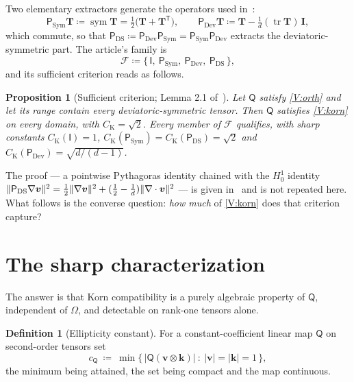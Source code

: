\documentclass[11pt]{article}
\theoremstyle{plain}
\newtheorem{proposition}[theorem]{Proposition}
\theoremstyle{definition}
\newtheorem{definition}[theorem]{Definition}
\theoremstyle{remark}
\newcommand{\IPi}{\mathsf{I}}
\newcommand{\AnyProj}{\mathsf{Q}}
\newcommand{\DSPi}{\mathsf{P}_{\mathrm{DS}}}
\newcommand{\DPi}{\mathsf{P}_{\mathrm{Dev}}}
\newcommand{\SPi}{\mathsf{P}_{\mathrm{Sym}}}
\newcommand{\bv}{\boldsymbol{v}}
\newcommand{\bk}{\boldsymbol{k}}
\newcommand{\CK}{C_{\mathrm{K}}}
\newcommand{\cP}{c_{\AnyProj}}
\DeclarePairedDelimiter{\norm}{\lVert}{\rVert}
\begin{document}
\noindent Two elementary extractors generate the operators used in~\cite{paper}:
\begin{equation}\label{eq:extractors}
  \SPi\mathbf{T}\coloneqq\operatorname{sym}\mathbf{T}
  =\tfrac12\bigl(\mathbf{T}+\mathbf{T}^{\mathsf T}\bigr),
  \qquad
  \DPi\mathbf{T}\coloneqq\mathbf{T}-\tfrac1d(\operatorname{tr}\mathbf{T})\,\mathbf{I},
\end{equation}
which commute, so that $\DSPi\coloneqq\DPi\SPi=\SPi\DPi$ extracts the deviatoric{-}symmetric
part. The article's family is
\begin{equation}\label{eq:family}
  \mathcal{F}\coloneqq\bigl\{\,\IPi,\ \SPi,\ \DPi,\ \DSPi\,\bigr\},
\end{equation}
and its sufficient criterion reads as follows.

\begin{proposition}[Sufficient criterion; Lemma 2.1 of~\cite{paper}]\label{prop:criterion}
Let $\AnyProj$ satisfy \cref{V:orth} and let its range contain every deviatoric{-}symmetric tensor.
Then $\AnyProj$ satisfies \cref{V:korn} on every domain, with $\CK=\sqrt2$. Every member of
$\mathcal{F}$ qualifies, with sharp constants
$\CK(\IPi)=1$, $\CK(\SPi)=\CK(\DSPi)=\sqrt2$ and $\CK(\DPi)=\sqrt{d/(d-1)}$.
\end{proposition}

\noindent The proof --- a pointwise Pythagoras identity chained with the $H^1_0$ identity
$\norm{\DSPi\nabla\bv}^2=\tfrac12\norm{\nabla\bv}^2+(\tfrac12-\tfrac1d)\norm{\nabla\cdot\bv}^2$
--- is given in~\cite{paper} and is not repeated here. What follows is the converse question:
\emph{how much} of \cref{V:korn} does that criterion capture?

\section{The sharp characterization}\label{sec:sharp}

The answer is that Korn compatibility is a purely algebraic property of $\AnyProj$, independent of
$\Omega$, and detectable on rank{-}one tensors alone.

\begin{definition}[Ellipticity constant]\label{def:cPi}
For a constant{-}coefficient linear map $\AnyProj$ on second{-}order tensors set
\begin{equation}\label{eq:cPi}
  \cP\ \coloneqq\ \min\bigl\{\,\bigl|\AnyProj(\bv\otimes\bk)\bigr|\ :\ |\bv|=|\bk|=1\,\bigr\},
\end{equation}
the minimum being attained, the set being compact and the map continuous.
\end{definition}
\end{document}
